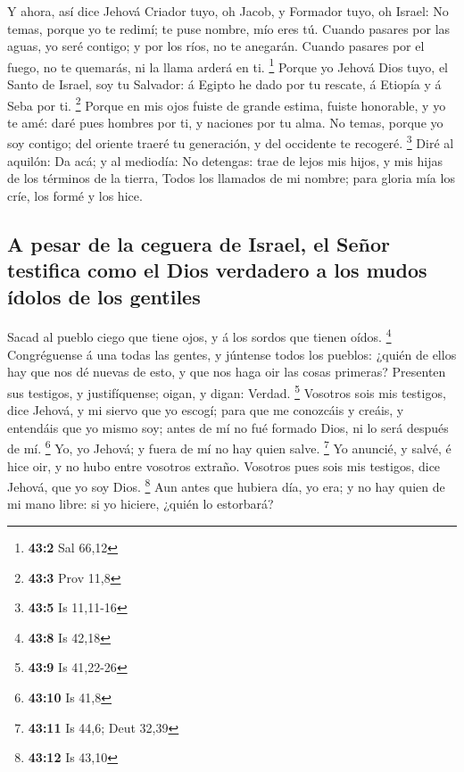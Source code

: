  Y ahora, así dice Jehová Criador tuyo, oh Jacob, y
Formador tuyo, oh Israel: No temas, porque yo te redimí; te puse nombre,
mío eres tú.  Cuando pasares por las aguas, yo seré
contigo; y por los ríos, no te anegarán. Cuando pasares por el fuego, no
te quemarás, ni la llama arderá en ti. \footnote{\textbf{43:2} Sal 66,12}
 Porque yo Jehová Dios tuyo, el Santo de Israel, soy tu
Salvador: á Egipto he dado por tu rescate, á Etiopía y á Seba por ti.
\footnote{\textbf{43:3} Prov 11,8}  Porque en mis ojos
fuiste de grande estima, fuiste honorable, y yo te amé: daré pues
hombres por ti, y naciones por tu alma.  No temas, porque
yo soy contigo; del oriente traeré tu generación, y del occidente te
recogeré. \footnote{\textbf{43:5} Is 11,11-16}  Diré al
aquilón: Da acá; y al mediodía: No detengas: trae de lejos mis hijos, y
mis hijas de los términos de la tierra,  Todos los
llamados de mi nombre; para gloria mía los críe, los formé y los hice.

\hypertarget{a-pesar-de-la-ceguera-de-israel-el-seuxf1or-testifica-como-el-dios-verdadero-a-los-mudos-uxeddolos-de-los-gentiles}{%
\subsection{A pesar de la ceguera de Israel, el Señor testifica como el
Dios verdadero a los mudos ídolos de los
gentiles}\label{a-pesar-de-la-ceguera-de-israel-el-seuxf1or-testifica-como-el-dios-verdadero-a-los-mudos-uxeddolos-de-los-gentiles}}

 Sacad al pueblo ciego que tiene ojos, y á los sordos que
tienen oídos. \footnote{\textbf{43:8} Is 42,18} 
Congréguense á una todas las gentes, y júntense todos los pueblos:
¿quién de ellos hay que nos dé nuevas de esto, y que nos haga oir las
cosas primeras? Presenten sus testigos, y justifíquense; oigan, y digan:
Verdad. \footnote{\textbf{43:9} Is 41,22-26}  Vosotros
sois mis testigos, dice Jehová, y mi siervo que yo escogí; para que me
conozcáis y creáis, y entendáis que yo mismo soy; antes de mí no fué
formado Dios, ni lo será después de mí. \footnote{\textbf{43:10} Is 41,8}
 Yo, yo Jehová; y fuera de mí no hay quien salve.
\footnote{\textbf{43:11} Is 44,6; Deut 32,39}  Yo
anuncié, y salvé, é hice oir, y no hubo entre vosotros extraño. Vosotros
pues sois mis testigos, dice Jehová, que yo soy Dios. \footnote{\textbf{43:12}
  Is 43,10}  Aun antes que hubiera día, yo era; y no hay
quien de mi mano libre: si yo hiciere, ¿quién lo estorbará?

